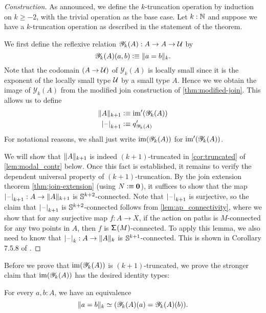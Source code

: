 \begin{proof}[Construction]
As announced, we define the $k$-truncation operation by induction on $k\geq-2$,
with the trivial operation as the base case. Let $k:\N$ and suppose we have
a $k$-truncation operation as described in the statement of the theorem.

We first define the reflexive relation $\mathscr{Y}_k(A) : A \to A \to \UU$ by
\begin{equation*}
\mathscr{Y}_k(A)(a,b) \defeq \trunc{k}{a=b}.
\end{equation*}
Note that the codomain $(A\to\UU)$ of $\mathscr{Y}_k(A)$ is locally small since it is the exponent of
the locally small type $\UU$ by a small type $A$. Hence we we obtain the image
of $\mathscr{Y}_k(A)$ from the modified join construction of \autoref{thm:modified-join}.
This allows us to define
\begin{align*}
\trunc{k+1}{A} & \defeq \im'(\mathscr{Y}_k(A)) \\
\tproj{k+1}{\blank} & \defeq q'_{\mathscr{Y}_k(A)}
\end{align*}
For notational reasons, we shall just write $\im(\mathscr{Y}_k(A))$ for $\im'(\mathscr{Y}_k(A))$. 

We will show that $\trunc{k+1}{A}$ is indeed $(k+1)$-truncated in \autoref{cor:truncated} of \autoref{lem:modal_contr} below. Once this fact is established, it remains to verify the dependent universal property of $(k+1)$-truncation.
By the join extension theorem \autoref{thm:join-extension} (using $N\defeq \emptyt$), it suffices to show that the map $\tproj{k+1}{\blank}:A\to\trunc{k+1}{A}$ is $\sphere{k+2}$-connected. Note that $\tproj{k+1}{\blank}$ is surjective, so the claim that $\tproj{k+1}{\blank}$ is $\sphere{k+2}$-connected follows from \autoref{lem:ap_connectivity}, where we show that for any surjective map $f:A\to X$, if the action on paths is $M$-connected for any two points in $A$, then $f$ is $\susp(M)$-connected. To apply this lemma, we also need to know that $\tproj{k}{\blank}:A\to\trunc{k}{A}$ is $\sphere{k+1}$-connected. This is shown in Corollary 7.5.8 of \cite{hottbook}.
\end{proof}

Before we prove that $\im(\mathscr{Y}_k(A))$ is $(k+1)$-truncated, we prove the stronger claim that $\im(\mathscr{Y}_k(A))$ has the desired identity types:

\begin{lem}\label{lem:modal_contr}
For every $a,b:A$, we have an equivalence
\begin{equation*}
\eqv{\trunc{k}{a=b}}{(\mathscr{Y}_k(A)(a)=\mathscr{Y}_k(A)(b))}.
\end{equation*}
\end{lem}

